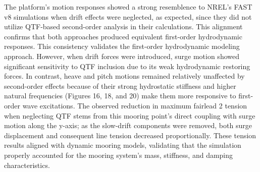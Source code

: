 \documentclass[a4paper, 11pt]{article}
\begin{document}
The platform's motion responses showed a strong resemblence to NREL's FAST v8 simulations when drift effects were neglected, as expected, since they did not utilize QTF-based second-order analysis in their calculations. This alignment confirms that both approaches produced equivalent first-order hydrodynamic responses. This consistency validates the first-order hydrodynamic modeling approach. However, when drift forces were introduced, surge motion showed significant sensitivity to QTF inclusion due to its weak hydrodynamic restoring forces. In contrast, heave and pitch motions remained relatively unaffected by second-order effects because of their strong hydrostatic stiffness and higher natural frequencies (Figures 16, 18, and 20) make them more responsive to first-order wave excitations. The observed reduction in maximum fairlead 2 tension when neglecting QTF stems from this mooring point's direct coupling with surge motion along the y-axis; as the slow-drift components were removed, both surge displacement and consequent line tension decreased proportionally. These tension results aligned with dynamic mooring models, validating that the simulation properly accounted for the mooring system's mass, stiffness, and damping characteristics.
\end{document}
